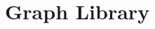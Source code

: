 \documentclass[10pt]{report}
\title{\myTitle} \author{\myAuthor} \date{\myDate}
\begin{document}
\maketitle

\chapter{Graph Library}

\end{document}
